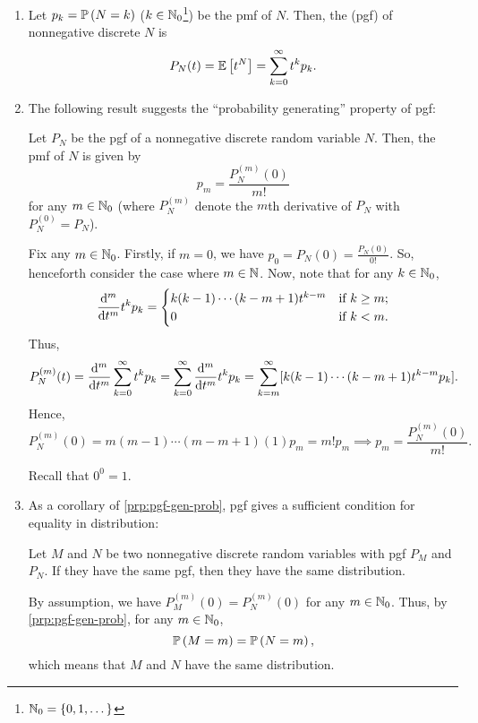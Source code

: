 \begin{enumerate}
\item Let \(p_k=\mathbb{P}\left(N=k\right)\) (\(k\in\mathbb{N}_0\)\footnote{\(\mathbb{N}_0=\{0,1,\dotsc\}\)})
be the pmf of \(N\). Then, the  (pgf) of
nonnegative discrete \(N\) is
\[
P_N(t)=\mathbb{E}\left[t^N\right]=\sum_{k=0}^{\infty}t^kp_k.
\]
\item The following result suggests the ``probability generating'' property of
pgf:
\begin{proposition}
\label{prp:pgf-gen-prob}
Let \(P_N\) be the pgf of a nonnegative discrete random variable \(N\). Then,
the pmf of \(N\) is given by
\[
p_m=\frac{P_N^{(m)}(0)}{m!}
\]
for any \(m\in\mathbb{N}_0\) (where \(P_N^{(m)}\) denote the \(m\)th derivative of
\(P_N\) with \(P_N^{(0)}=P_N\)).
\end{proposition}
\begin{pf}
Fix any \(m\in\mathbb{N}_0\). Firstly, if \(m=0\), we have \(\displaystyle
p_0=P_N(0)=\frac{P_N(0)}{0!}\). So, henceforth consider the case where
\(m\in\mathbb{N}\). Now, note that for any \(k\in\mathbb{N}_0\),
\[
\dv[m]{}{t}t^kp_k
=\begin{cases}
k(k-1)\dotsb(k-m+1)t^{k-m}&\text{if \(k\ge m\)};\\
0&\text{if \(k<m\)}.
\end{cases}
\]
Thus,
\[
P_N^{(m)}(t)=\dv[m]{}{t}\sum_{k=0}^{\infty}t^kp_k
=\sum_{k=0}^{\infty}\dv[m]{}{t}t^kp_k
=\sum_{k=m}^{\infty}[k(k-1)\dotsb(k-m+1)t^{k-m}p_k].
\]
Hence,
\[
P_N^{(m)}(0)=m(m-1)\dotsb(m-m+1)(1)p_m
=m!p_m\implies p_m=\frac{P_N^{(m)}(0)}{m!}.
\]
\begin{note}
Recall that \(0^0=1\).
\end{note}
\end{pf}

\item As a corollary of \cref{prp:pgf-gen-prob}, pgf gives a sufficient
condition for equality in distribution:
\begin{corollary}
\label{cor:pgf-equal-dist}
Let \(M\) and \(N\) be two nonnegative discrete random variables with pgf
\(P_M\) and \(P_N\). If they have the same pgf, then they have the same
distribution.
\end{corollary}
\begin{pf}
By assumption, we have \(P_M^{(m)}(0)=P_N^{(m)}(0)\) for any \(m\in\mathbb{N}_0\).
Thus, by \cref{prp:pgf-gen-prob}, for any \(m\in\mathbb{N}_0\),
\[
\mathbb{P}\left(M=m\right)=\mathbb{P}\left(N=m\right),
\]
which means that \(M\) and \(N\) have the same distribution.
\end{pf}


\end{enumerate}
